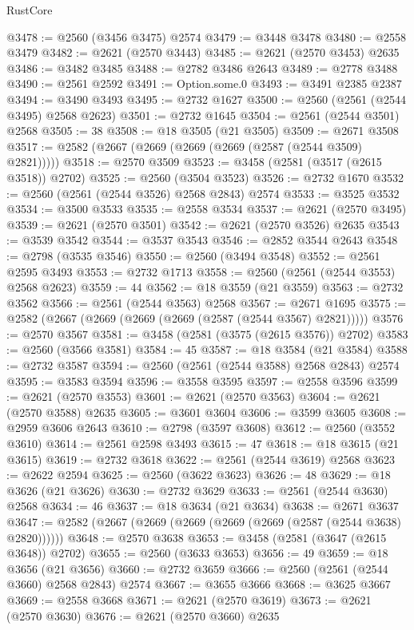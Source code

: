 \begin{lexlean}{RustCore}
\begin{coremodule}
@3478 := @2560 (@3456 @3475) @2574
@3479 := @3448 @3478
@3480 := @2558 @3479
@3482 := @2621 (@2570 @3443)
@3485 := @2621 (@2570 @3453) @2635
@3486 := @3482 @3485
@3488 := @2782 @3486 @2643
@3489 := @2778 @3488
@3490 := @2561 @2592
@3491 := Option.some.{0}
@3493 := @3491 @2385 @2387
@3494 := @3490 @3493
@3495 := @2732 @1627
@3500 := @2560 (@2561 (@2544 @3495) @2568 @2623)
@3501 := @2732 @1645
@3504 := @2561 (@2544 @3501) @2568
@3505 := 38
@3508 := @18 @3505 (@21 @3505)
@3509 := @2671 @3508
@3517 := @2582 (@2667 (@2669 (@2669 (@2669 (@2587 (@2544 @3509) @2821)))))
@3518 := @2570 @3509
@3523 := @3458 (@2581 (@3517 (@2615 @3518)) @2702)
@3525 := @2560 (@3504 @3523)
@3526 := @2732 @1670
@3532 := @2560 (@2561 (@2544 @3526) @2568 @2843) @2574
@3533 := @3525 @3532
@3534 := @3500 @3533
@3535 := @2558 @3534
@3537 := @2621 (@2570 @3495)
@3539 := @2621 (@2570 @3501)
@3542 := @2621 (@2570 @3526) @2635
@3543 := @3539 @3542
@3544 := @3537 @3543
@3546 := @2852 @3544 @2643
@3548 := @2798 (@3535 @3546)
@3550 := @2560 (@3494 @3548)
@3552 := @2561 @2595 @3493
@3553 := @2732 @1713
@3558 := @2560 (@2561 (@2544 @3553) @2568 @2623)
@3559 := 44
@3562 := @18 @3559 (@21 @3559)
@3563 := @2732 @3562
@3566 := @2561 (@2544 @3563) @2568
@3567 := @2671 @1695
@3575 := @2582 (@2667 (@2669 (@2669 (@2669 (@2587 (@2544 @3567) @2821)))))
@3576 := @2570 @3567
@3581 := @3458 (@2581 (@3575 (@2615 @3576)) @2702)
@3583 := @2560 (@3566 @3581)
@3584 := 45
@3587 := @18 @3584 (@21 @3584)
@3588 := @2732 @3587
@3594 := @2560 (@2561 (@2544 @3588) @2568 @2843) @2574
@3595 := @3583 @3594
@3596 := @3558 @3595
@3597 := @2558 @3596
@3599 := @2621 (@2570 @3553)
@3601 := @2621 (@2570 @3563)
@3604 := @2621 (@2570 @3588) @2635
@3605 := @3601 @3604
@3606 := @3599 @3605
@3608 := @2959 @3606 @2643
@3610 := @2798 (@3597 @3608)
@3612 := @2560 (@3552 @3610)
@3614 := @2561 @2598 @3493
@3615 := 47
@3618 := @18 @3615 (@21 @3615)
@3619 := @2732 @3618
@3622 := @2561 (@2544 @3619) @2568
@3623 := @2622 @2594
@3625 := @2560 (@3622 @3623)
@3626 := 48
@3629 := @18 @3626 (@21 @3626)
@3630 := @2732 @3629
@3633 := @2561 (@2544 @3630) @2568
@3634 := 46
@3637 := @18 @3634 (@21 @3634)
@3638 := @2671 @3637
@3647 := @2582 (@2667 (@2669 (@2669 (@2669 (@2669 (@2587 (@2544 @3638) @2820))))))
@3648 := @2570 @3638
@3653 := @3458 (@2581 (@3647 (@2615 @3648)) @2702)
@3655 := @2560 (@3633 @3653)
@3656 := 49
@3659 := @18 @3656 (@21 @3656)
@3660 := @2732 @3659
@3666 := @2560 (@2561 (@2544 @3660) @2568 @2843) @2574
@3667 := @3655 @3666
@3668 := @3625 @3667
@3669 := @2558 @3668
@3671 := @2621 (@2570 @3619)
@3673 := @2621 (@2570 @3630)
@3676 := @2621 (@2570 @3660) @2635

\end{coremodule}
\end{lexlean}
